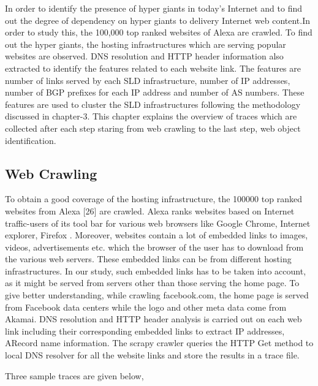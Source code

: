 In order to identify the presence of hyper giants in today's Internet and to find out the degree of dependency on hyper giants to delivery Internet web content.In order to study this, the 100,000 top ranked websites of Alexa are crawled. To find out the hyper giants, the hosting infrastructures which are serving popular websites are observed. DNS resolution and HTTP header information also extracted to identify the features related to each website link. The features are number of links served by each SLD infrastructure, number of IP addresses, number of BGP prefixes for each IP address and number of AS numbers. These features are used to cluster the SLD infrastructures following the methodology discussed in chapter-3. This chapter explains the overview of traces which are collected after each step staring from web crawling to the last step, web object identification.
\subsection{Web Crawling}
To obtain a good coverage of the hosting infrastructure, the 100000 top ranked websites from Alexa [26] are crawled. Alexa ranks websites based on Internet traffic-users of its tool bar for various web browsers like Google Chrome, Internet explorer, Firefox . Moreover, websites contain a lot of embedded links to images, videos, advertisements etc. which the browser of the user has to download from the various web servers. These embedded links can be from different hosting infrastructures. In our study, such embedded links has to be taken into account, as it might be served from servers other than those serving the home page. To give better understanding, while crawling facebook.com, the home page is served from Facebook data centers while the logo and other meta data come from Akamai. DNS resolution and HTTP header analysis is carried out on each web link including their corresponding embedded links to extract IP addresses, ARecord name information. The scrapy crawler queries the HTTP Get method to local DNS resolver for all the website links and store the results in a trace file.

Three sample traces are given below,

\begin{center}
\end{center}

